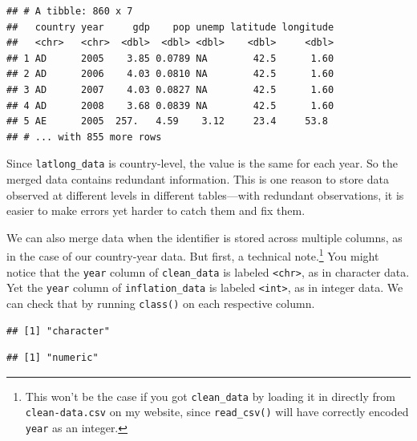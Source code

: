 \documentclass[
  12pt,
  oneside,openany]{book}
\newenvironment{Shaded}{\begin{snugshade}}{\end{snugshade}}
\newcommand{\KeywordTok}[1]{\textcolor[rgb]{0.13,0.29,0.53}{\textbf{#1}}}
\newcommand{\NormalTok}[1]{#1}
\newcommand{\OperatorTok}[1]{\textcolor[rgb]{0.81,0.36,0.00}{\textbf{#1}}}
\begin{document}
\begin{verbatim}
## # A tibble: 860 x 7
##   country year     gdp    pop unemp latitude longitude
##   <chr>   <chr>  <dbl>  <dbl> <dbl>    <dbl>     <dbl>
## 1 AD      2005    3.85 0.0789 NA        42.5      1.60
## 2 AD      2006    4.03 0.0810 NA        42.5      1.60
## 3 AD      2007    4.03 0.0827 NA        42.5      1.60
## 4 AD      2008    3.68 0.0839 NA        42.5      1.60
## 5 AE      2005  257.   4.59    3.12     23.4     53.8 
## # ... with 855 more rows
\end{verbatim}

Since \texttt{latlong\_data} is country-level, the value is the same for each year. So the merged data contains redundant information. This is one reason to store data observed at different levels in different tables---with redundant observations, it is easier to make errors yet harder to catch them and fix them.

We can also merge data when the identifier is stored across multiple columns, as in the case of our country-year data. But first, a technical note.\footnote{This won't be the case if you got \texttt{clean\_data} by loading it in directly from \texttt{clean-data.csv} on my website, since \texttt{read\_csv()} will have correctly encoded \texttt{year} as an integer.} You might notice that the \texttt{year} column of \texttt{clean\_data} is labeled \texttt{\textless{}chr\textgreater{}}, as in character data. Yet the \texttt{year} column of \texttt{inflation\_data} is labeled \texttt{\textless{}int\textgreater{}}, as in integer data. We can check that by running \texttt{class()} on each respective column.

\begin{Shaded}
\end{Shaded}

\begin{verbatim}
## [1] "character"
\end{verbatim}

\begin{Shaded}
\end{Shaded}

\begin{verbatim}
## [1] "numeric"
\end{verbatim}
\end{document}
